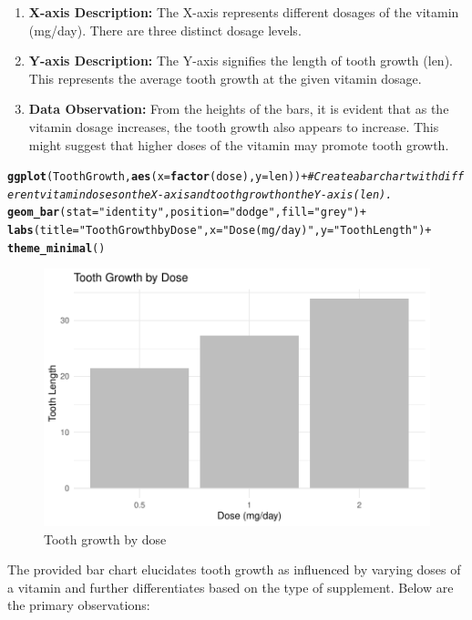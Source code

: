 \documentclass{article}\usepackage[]{graphicx}\usepackage[]{xcolor}
\makeatletter
\def\maxwidth{ %
  \ifdim\Gin@nat@width>\linewidth
    \linewidth
  \else
    \Gin@nat@width
  \fi
}
\newcommand{\hlstr}[1]{\textcolor[rgb]{0.192,0.494,0.8}{#1}}%
\newcommand{\hlcom}[1]{\textcolor[rgb]{0.678,0.584,0.686}{\textit{#1}}}%
\newcommand{\hlopt}[1]{\textcolor[rgb]{0,0,0}{#1}}%
\newcommand{\hlstd}[1]{\textcolor[rgb]{0.345,0.345,0.345}{#1}}%
\newcommand{\hlkwc}[1]{\textcolor[rgb]{0.333,0.667,0.333}{#1}}%
\newcommand{\hlkwd}[1]{\textcolor[rgb]{0.737,0.353,0.396}{\textbf{#1}}}%
\newenvironment{kframe}{%
 \def\at@end@of@kframe{}%
 \ifinner\ifhmode%
  \def\at@end@of@kframe{\end{minipage}}%
  \begin{minipage}{\columnwidth}%
 \fi\fi%
 \def\FrameCommand##1{\hskip\@totalleftmargin \hskip-\fboxsep
 \colorbox{shadecolor}{##1}\hskip-\fboxsep
     \hskip-\linewidth \hskip-\@totalleftmargin \hskip\columnwidth}%
 \MakeFramed {\advance\hsize-\width
   \@totalleftmargin\z@ \linewidth\hsize
   \@setminipage}}%
 {\par\unskip\endMakeFramed%
 \at@end@of@kframe}
\newenvironment{knitrout}{}{} %
\makeatother
\begin{document}
\begin{enumerate}
    \item \textbf{X-axis Description:} The X-axis represents different dosages of the vitamin (mg/day). There are three distinct dosage levels.
    
    \item \textbf{Y-axis Description:} The Y-axis signifies the length of tooth growth (len). This represents the average tooth growth at the given vitamin dosage.
    \item \textbf{Data Observation:} From the heights of the bars, it is evident that as the vitamin dosage increases, the tooth growth also appears to increase. This might suggest that higher doses of the vitamin may promote tooth growth.
\end{enumerate}
\begin{knitrout}
\color{fgcolor}\begin{kframe}
\begin{alltt}
\hlkwd{ggplot}\hlstd{(ToothGrowth,} \hlkwd{aes}\hlstd{(}\hlkwc{x} \hlstd{=} \hlkwd{factor}\hlstd{(dose),} \hlkwc{y} \hlstd{= len))} \hlopt{+}\hlcom{# Create a bar chart with different vitamin doses on the X-axis and tooth growth on the Y-axis (len).}
  \hlkwd{geom_bar}\hlstd{(}\hlkwc{stat} \hlstd{=} \hlstr{"identity"}\hlstd{,} \hlkwc{position} \hlstd{=} \hlstr{"dodge"}\hlstd{,} \hlkwc{fill} \hlstd{=} \hlstr{"grey"}\hlstd{)} \hlopt{+}
  \hlkwd{labs}\hlstd{(}\hlkwc{title} \hlstd{=} \hlstr{"Tooth Growth by Dose"}\hlstd{,} \hlkwc{x} \hlstd{=} \hlstr{"Dose (mg/day)"}\hlstd{,} \hlkwc{y} \hlstd{=} \hlstr{"Tooth Length"}\hlstd{)} \hlopt{+}
  \hlkwd{theme_minimal}\hlstd{()}
\end{alltt}
\end{kframe}\begin{figure}
\includegraphics[width=\maxwidth]{figure/barchart1-1} \caption[Tooth growth by dose]{Tooth growth by dose}\label{fig:barchart1}
\end{figure}

\end{knitrout}
The provided bar chart elucidates tooth growth as influenced by varying doses of a vitamin and further differentiates based on the type of supplement. Below are the primary observations:
\end{document}
